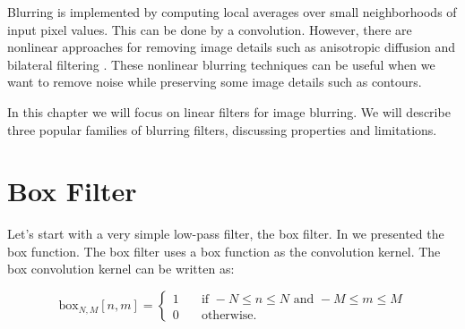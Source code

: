 Blurring is implemented by computing local averages over small neighborhoods of input pixel values. This can be done by a convolution. However, there are nonlinear approaches for removing image details such as anisotropic diffusion \cite{Perona1990} and bilateral filtering \cite{Paris2009}. These nonlinear blurring techniques can be useful when we want to remove noise while preserving some image details such as contours.

In this chapter we will focus on linear filters for image blurring. We will describe three popular families of blurring filters, discussing properties and limitations. 



%
%
%
%



\section{Box Filter}


Let's start with a very simple low-pass filter, the box filter.  
 In \sect{\ref{sec:box_function}} we presented the box function. The box filter uses a box function as the convolution kernel. 
The box convolution kernel can be written as:

\begin{equation}
\text{box}_{N,M} \left[n,m \right] = 
\begin{cases}
    1       & \quad \text{if } -N \leq n \leq N  \text{~and~}  -M \leq m \leq M\\
    0       & \quad \text{otherwise.} 
  \end{cases}
\end{equation}

